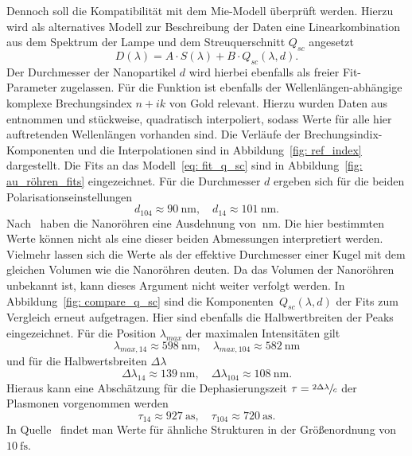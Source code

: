 Dennoch soll die Kompatibilität mit dem Mie-Modell überprüft werden. Hierzu wird als alternatives Modell zur Beschreibung der
Daten eine Linearkombination aus dem Spektrum der Lampe und dem Streuquerschnitt $Q_{sc}$ angesetzt
\begin{equation}
  D(\lambda) = A \cdot S(\lambda) + B \cdot Q_{sc}(\lambda, d).
  \label{eq: fit_q_sc}
\end{equation}
Der Durchmesser der Nanopartikel $d$ wird hierbei ebenfalls als freier Fit-Parameter zugelassen.
Für die Funktion ist ebenfalls der Wellenlängen-abhängige komplexe Brechungsindex $n + ik$ von Gold relevant. Hierzu wurden
Daten aus~\cite{ref_index_au} entnommen und stückweise, quadratisch interpoliert, sodass Werte für alle hier auftretenden Wellenlängen
vorhanden sind. Die Verläufe der Brechungsindix-Komponenten und die Interpolationen sind in Abbildung~\ref{fig: ref_index}
dargestellt. Die Fits an das Modell~\eqref{eq: fit_q_sc} sind in Abbildung~\ref{fig: au_röhren_fits} eingezeichnet.
Für die Durchmesser $d$ ergeben sich für die beiden Polarisationseinstellungen
\begin{equation}
  d_{104} \approx \SI{90}{\nano\meter}, \quad d_{14} \approx \SI{101}{\nano\meter}.
\end{equation}
Nach~\cite{anleitung} haben die Nanoröhren eine Ausdehnung von $\SI{}{\nano\meter}$. Die hier bestimmten Werte
können nicht als eine dieser beiden Abmessungen interpretiert werden. Vielmehr lassen sich die Werte als
der effektive Durchmesser einer Kugel mit dem gleichen Volumen wie die Nanoröhren deuten. Da das Volumen der Nanoröhren
unbekannt ist, kann dieses Argument nicht weiter verfolgt werden.
In Abbildung~\ref{fig: compare_q_sc} sind die Komponenten~$Q_{sc}(\lambda, d)$ der Fits zum Vergleich erneut aufgetragen. Hier sind ebenfalls
die Halbwertbreiten der Peaks eingezeichnet. Für die Position $\lambda_{max}$ der maximalen Intensitäten gilt
\begin{equation}
  \lambda_{max, 14} \approx \SI{598}{\nano\meter}, \quad \lambda_{max, 104} \approx \SI{582}{\nano\meter}
\end{equation}
und für die Halbwertsbreiten $\Delta \lambda$
\begin{equation}
  \Delta \lambda_{14} \approx \SI{139}{\nano\meter}, \quad \Delta \lambda_{104} \approx \SI{108}{\nano\meter}.
\end{equation}
Hieraus kann eine Abschätzung für die Dephasierungszeit $\tau = \sfrac{2 \Delta \lambda}{c}$ \cite{t_deph} der Plasmonen vorgenommen werden
\begin{equation}
  \tau_{14} \approx \SI{927}{\atto \second}, \quad   \tau_{104} \approx \SI{720}{\atto\second}.
\end{equation}
In Quelle~\cite{t_deph} findet man Werte für ähnliche Strukturen in der Größenordnung von $\SI{10}{\femto\second}$.

